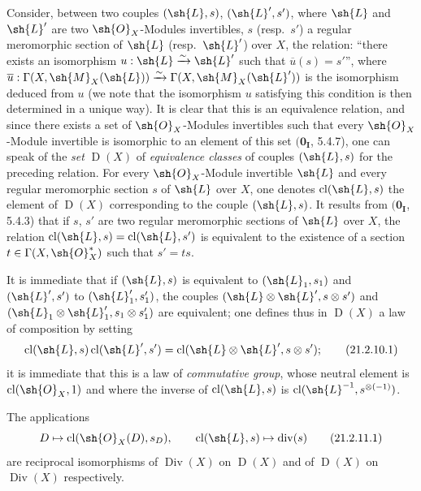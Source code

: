 \begin{env}[21.2.10]
\label{IV.21.2.10}
Consider, between two couples $(\sh{L},s)$, $(\sh{L}',s')$, where $\sh{L}$ and $\sh{L}'$ are two $\sh{O}_X$-Modules invertibles, $s$ (resp.\ $s'$) a regular meromorphic section of $\sh{L}$ (resp.\ $\sh{L}'$) over $X$, the relation: ``there exists an isomorphism $u:\sh{L}\xrightarrow{\sim}\sh{L}'$ such that $\overline{u}(s)=s'$'', where $\overline{u}:\Gamma(X,\sh{M}_X(\sh{L}))\xrightarrow{\sim}\Gamma(X,\sh{M}_X(\sh{L}'))$ is the isomorphism deduced from $u$ (we note that the isomorphism $u$ satisfying this condition is then determined in a unique way).
It is clear that this is an equivalence relation, and since there exists a set of $\sh{O}_X$-Modules invertibles such that every $\sh{O}_X$-Module invertible is isomorphic to an element of this set $(\mathbf{0_I}$, 5.4.7), one can speak of the \emph{set} $\operatorname{D}(X)$ of \emph{equivalence classes} of couples $(\sh{L},s)$ for the preceding relation.
For every $\sh{O}_X$-Module invertible $\sh{L}$ and every regular meromorphic section $s$ of $\sh{L}$ over $X$, one denotes $\operatorname{cl}(\sh{L},s)$ the element of $\operatorname{D}(X)$ corresponding to the couple $(\sh{L},s)$.
It results from $(\mathbf{0_I}$, 5.4.3) that if $s$, $s'$ are two regular meromorphic sections of $\sh{L}$ over $X$, the relation $\operatorname{cl}(\sh{L},s)=\operatorname{cl}(\sh{L},s')$ is equivalent to the existence of a section $t\in\Gamma(X,\sh{O}_X^*)$ such that $s'=ts$.

It is immediate that if $(\sh{L},s)$ is equivalent to $(\sh{L}_1,s_1)$ and $(\sh{L}',s')$ to $(\sh{L}'_1,s'_1)$, the couples $(\sh{L}\otimes\sh{L}',s\otimes s')$ and $(\sh{L}_1\otimes\sh{L}'_1,s_1\otimes s'_1)$ are equivalent;
one defines thus in $\operatorname{D}(X)$ a law of composition by setting
\[
\label{IV.21.2.10.1}
  \operatorname{cl}(\sh{L},s)\operatorname{cl}(\sh{L}',s')=\operatorname{cl}(\sh{L}\otimes\sh{L}',s\otimes s');
  \tag{21.2.10.1}
\]
it is immediate that this is a law of \emph{commutative group}, whose neutral element is $\operatorname{cl}(\sh{O}_X,1)$ and where the inverse of $\operatorname{cl}(\sh{L},s)$ is $\operatorname{cl}(\sh{L}^{-1},s^{\otimes(-1)})$.
\end{env}

\begin{proposition}[21.2.11]
\label{IV.21.2.11}
The applications
\[
\label{IV.21.2.11.1}
  D\mapsto\operatorname{cl}(\sh{O}_X(D),s_D),\qquad\operatorname{cl}(\sh{L},s)\mapsto\operatorname{div}(s)
  \tag{21.2.11.1}
\]
are reciprocal isomorphisms of $\operatorname{Div}(X)$ on $\operatorname{D}(X)$ and of $\operatorname{D}(X)$ on $\operatorname{Div}(X)$ respectively.
\end{proposition}

